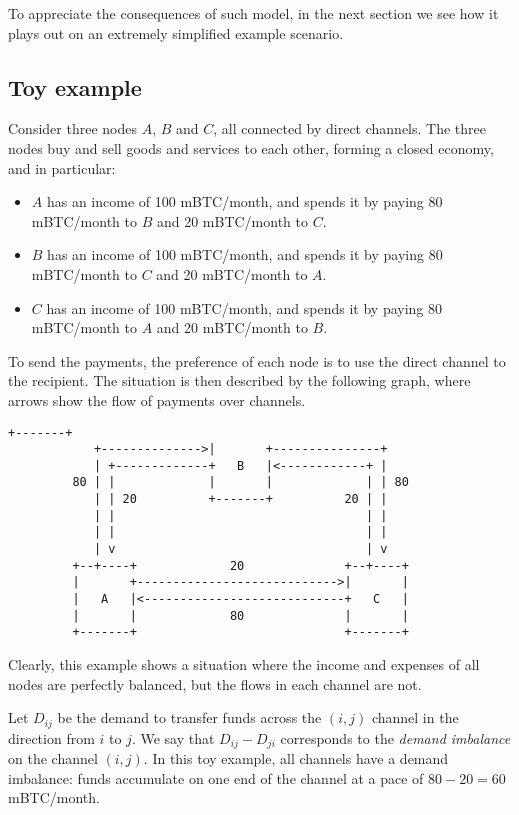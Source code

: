 \documentclass[a4paper]{article}
\begin{document}
To appreciate the consequences of such model, in the next section we see how it plays out on an extremely simplified example scenario.

\subsection{Toy example}

Consider three nodes $A$, $B$ and $C$, all connected by direct channels. The three nodes buy and sell goods and services to each other, forming a closed economy, and in particular:
\begin{itemize}
\item $A$ has an income of 100 mBTC/month, and spends it by paying 80 mBTC/month to $B$ and 20 mBTC/month to $C$.
\item $B$ has an income of 100 mBTC/month, and spends it by paying 80 mBTC/month to $C$ and 20 mBTC/month to $A$.
\item $C$ has an income of 100 mBTC/month, and spends it by paying 80 mBTC/month to $A$ and 20 mBTC/month to $B$.
\end{itemize}

To send the payments, the preference of each node is to use the direct channel to the recipient. The situation is then described by the following graph, where arrows show the flow of payments over channels.

\begin{Verbatim}[samepage=true]
                            +-------+
            +-------------->|       +---------------+
            | +-------------+   B   |<------------+ |
         80 | |             |       |             | | 80
            | | 20          +-------+          20 | |
            | |                                   | |
            | |                                   | |
            | v                                   | v
         +--+----+             20              +--+----+
         |       +---------------------------->|       |
         |   A   |<----------------------------+   C   |
         |       |             80              |       |
         +-------+                             +-------+
\end{Verbatim}

Clearly, this example shows a situation where the income and expenses of all nodes are perfectly balanced, but the flows in each channel are not.

Let $D_{ij}$ be the demand to transfer funds across the $(i,j)$ channel in the direction from $i$ to $j$. We say that $D_{ij} - D_{ji}$ corresponds to the \emph{demand imbalance} on the channel $(i,j)$. In this toy example, all channels have a demand imbalance: funds accumulate on one end of the channel at a pace of $80-20=60$ mBTC/month.
\end{document}
